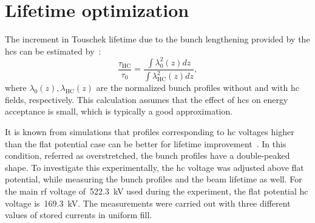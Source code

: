 \documentclass[a4paper,
               ]{jacow}
\begin{document}
\section{Lifetime optimization}
The increment in Touschek lifetime due to the bunch lengthening provided by the \glspl{hc} can be estimated by~\cite{Byrd2001}:
\begin{equation}
    \frac{\tau_\text{HC}}{\tau_0} = \frac{\int{\lambda^2_0(z)dz}}{\int{\lambda^2_\text{HC}(z)dz}},
    \label{eq:lifetime}
\end{equation}
where $\lambda_0(z), \lambda_\text{HC}(z)$ are the normalized bunch profiles without and with \gls{hc} fields, respectively. This calculation assumes that the effect of \glspl{hc} on energy acceptance is small, which is typically a good approximation.

It is known from simulations that profiles corresponding to \gls{hc} voltages higher than the flat potential case can be better for lifetime improvement~\cite{AlvesSa2023, Penco2006}. In this condition, referred as overstretched, the bunch profiles have a double-peaked shape. To investigate this experimentally, the \gls{hc} voltage was adjusted above flat potential, while measuring the bunch profiles and the beam lifetime as well. For the main rf voltage of~\SI{522.3}{\kilo\volt} used during the experiment, the flat potential \gls{hc} voltage is~\SI{169.3}{\kilo\volt}. The measurements were carried out with three different values of stored currents in uniform fill.
\end{document}
